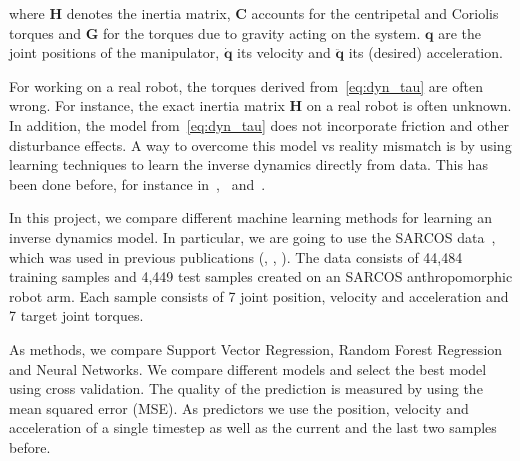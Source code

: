 \documentclass[letterpaper, 10 pt, conference]{ieeeconf}  %
\renewcommand{\b}[1]{\bm{#1}}
\begin{document}
where $\b{H}$ denotes the inertia matrix, $\b{C}$ accounts for the centripetal and Coriolis torques and $\b{G}$ for the torques due to gravity acting on the system. $\b{q}$ are the joint positions of the manipulator, $\dot{\b{q}}$ its velocity and $\ddot{\b{q}}$ its (desired) acceleration.

For working on a real robot, the torques derived from~\cref{eq:dyn_tau} are often wrong. For instance, the exact inertia matrix $\b{H}$ on a real robot is often unknown. In addition, the model from~\cref{eq:dyn_tau} does not incorporate friction and other disturbance effects. A way to overcome this model vs reality mismatch is by using learning techniques to learn the inverse dynamics directly from data. This has been done before, for instance in~\cite{slotine1987adaptive},~\cite{ratliff2016doomed} and~\cite{meier2016towards}.

In this project, we compare different machine learning methods for learning an inverse dynamics model. In particular, we are going to use the SARCOS data~\cite{SARCOS_data}, which was used in previous publications (\cite{vijayakumar2000lwpr}, \cite{vijayakumar2002statistical}, \cite{vijayakumar2005incremental}). The data consists of 44,484 training samples and 4,449 test samples created on an SARCOS anthropomorphic robot arm. Each sample consists of 7 joint position, velocity and acceleration and 7 target joint torques.

As methods, we compare Support Vector Regression, Random Forest Regression and Neural Networks. We compare different models and select the best model using cross validation. The quality of the prediction is measured by using the mean squared error (MSE). As predictors we use the position, velocity and acceleration of a single timestep as well as the current and the last two samples before.



{}
\end{document}
